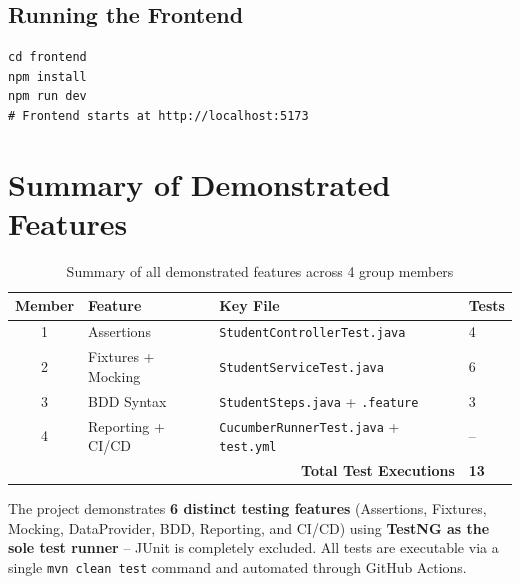 \documentclass[12pt,a4paper]{article}
\begin{document}
\subsection{Running the Frontend}

\begin{lstlisting}[style=bashstyle, caption={Start the React frontend}]
cd frontend
npm install
npm run dev
# Frontend starts at http://localhost:5173
\end{lstlisting}

\section{Summary of Demonstrated Features}

\begin{table}[h!]
\centering
\begin{tabular}{clll}
    \toprule
    \textbf{Member} & \textbf{Feature} & \textbf{Key File} & \textbf{Tests} \\
    \midrule
    1 & Assertions & \texttt{StudentControllerTest.java} & 4 \\
    2 & Fixtures + Mocking & \texttt{StudentServiceTest.java} & 6 \\
    3 & BDD Syntax & \texttt{StudentSteps.java} + \texttt{.feature} & 3 \\
    4 & Reporting + CI/CD & \texttt{CucumberRunnerTest.java} + \texttt{test.yml} & -- \\
    \midrule
    \multicolumn{3}{r}{\textbf{Total Test Executions}} & \textbf{13} \\
    \bottomrule
\end{tabular}
\caption{Summary of all demonstrated features across 4 group members}
\end{table}

\begin{tcolorbox}[noteboxstyle, title=Key Takeaway]
The project demonstrates \textbf{6 distinct testing features} (Assertions, Fixtures, Mocking, DataProvider, BDD, Reporting, and CI/CD) using \textbf{TestNG as the sole test runner} -- JUnit is completely excluded. All tests are executable via a single \texttt{mvn clean test} command and automated through GitHub Actions.
\end{tcolorbox}
\end{document}
